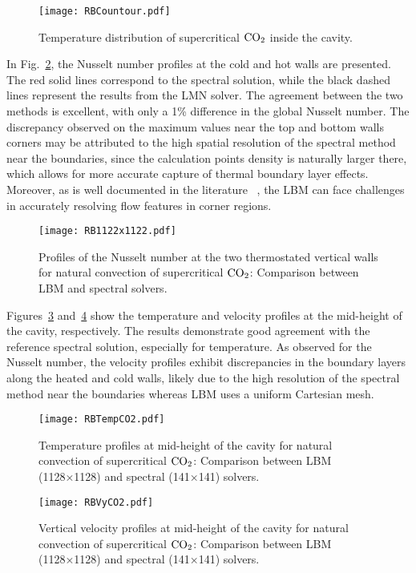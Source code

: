 \begin{figure}[H]
\centering
\texttt{[image: RBCountour.pdf]}
\caption{Temperature distribution of supercritical $\ce{CO2}$ inside the
cavity.}
\label{fig:RB_temperature}
\end{figure}

In Fig.~\ref{fig:RB_validation}, the Nusselt number profiles at the cold and hot
walls are presented. The red solid lines correspond to the spectral solution,
while the black dashed lines represent the results from the LMN solver. The
agreement between the two methods is excellent, with only a 1\% difference in
the global Nusselt number. The discrepancy observed on the maximum values near
the top and bottom walls corners may be attributed to the high spatial
resolution of the spectral method near the boundaries, since the calculation
points density is naturally larger there, which allows for more accurate capture
of thermal boundary layer effects. Moreover, as is well documented in the
literature ~\cite{kruger2017lattice}, the LBM can face challenges in accurately
resolving flow features in corner regions.


\begin{figure}[htbp]
\centering
\texttt{[image: RB1122x1122.pdf]}
\caption{Profiles of the Nusselt number at the two thermostated vertical walls
for natural convection of supercritical $\ce{CO2}$: Comparison between LBM and
spectral solvers.}
\label{fig:RB_validation}
\end{figure}

Figures~\ref{fig:RB_temp_profiles} and~\ref{fig:RB_velocity_profiles} show the
temperature and velocity profiles at the mid-height of the cavity, respectively.
The results demonstrate good agreement with the reference spectral solution,
especially for temperature. As observed for the Nusselt number, the velocity
profiles exhibit discrepancies in the boundary layers along the heated and cold
walls, likely due to the high resolution of the spectral method near the
boundaries whereas LBM uses a uniform Cartesian mesh. 

\begin{figure}[htbp]
\centering
\texttt{[image: RBTempCO2.pdf]}
\caption{Temperature profiles at mid-height of the cavity for natural convection
of supercritical $\ce{CO2}$: Comparison between LBM (1128×1128) and spectral
(141×141) solvers.}
\label{fig:RB_temp_profiles}
\end{figure}

\begin{figure}[H]
\centering
\texttt{[image: RBVyCO2.pdf]}
\caption{Vertical velocity profiles at mid-height of the cavity for natural
convection of supercritical $\ce{CO2}$: Comparison between LBM (1128×1128) and
spectral (141×141) solvers.}
\label{fig:RB_velocity_profiles}
\end{figure}


